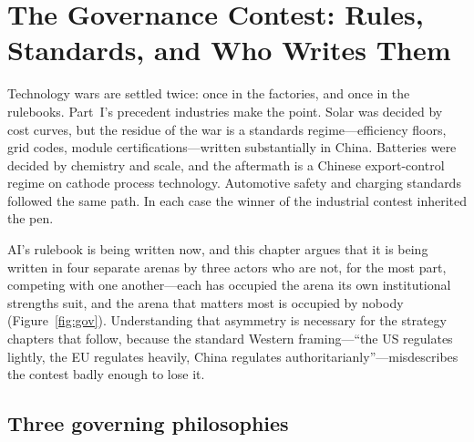 \chapter{The Governance Contest: Rules, Standards, and Who Writes Them}
\label{ch:governance}

Technology wars are settled twice: once in the factories, and once in the rulebooks. Part~I's precedent industries make the point. Solar was decided by cost curves, but the residue of the war is a standards regime---efficiency floors, grid codes, module certifications---written substantially in China. Batteries were decided by chemistry and scale, and the aftermath is a Chinese export-control regime on cathode process technology. Automotive safety and charging standards followed the same path. In each case the winner of the industrial contest inherited the pen.

AI's rulebook is being written now, and this chapter argues that it is being written in four separate arenas by three actors who are not, for the most part, competing with one another---each has occupied the arena its own institutional strengths suit, and the arena that matters most is occupied by nobody (Figure~\ref{fig:gov}). Understanding that asymmetry is necessary for the strategy chapters that follow, because the standard Western framing---``the US regulates lightly, the EU regulates heavily, China regulates authoritarianly''---misdescribes the contest badly enough to lose it.



\section{Three governing philosophies}

